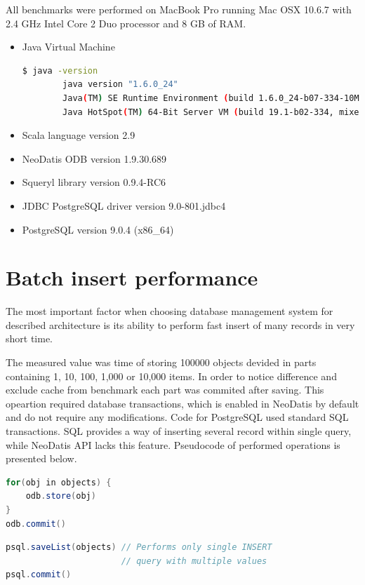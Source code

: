 \documentclass[a4paper,titlepage,12pt]{article}
\begin{document}
All benchmarks were performed on MacBook Pro running Mac OSX 10.6.7 with 2.4 GHz Intel Core 2 Duo processor and 8 GB of RAM.

\begin{itemize}
    \item Java Virtual Machine
        \begin{lstlisting}[language=bash]
        $ java -version
        java version "1.6.0_24"
        Java(TM) SE Runtime Environment (build 1.6.0_24-b07-334-10M3326)
        Java HotSpot(TM) 64-Bit Server VM (build 19.1-b02-334, mixed mode)
        \end{lstlisting}
        
    \item Scala language version 2.9
    \item NeoDatis ODB version 1.9.30.689
    \item Squeryl library version 0.9.4-RC6
    \item JDBC PostgreSQL driver version 9.0-801.jdbc4
    \item PostgreSQL version 9.0.4 (x86\_64)


\end{itemize}

\section{Batch insert performance}\label{sec:batch_insert}


The most important factor when choosing database management system for described architecture is its ability to perform fast insert of many records in very short time.

The measured value was time of storing 100000 objects devided in parts containing 1, 10, 100, 1,000 or 10,000 items. In order to notice difference and exclude cache from benchmark each part was commited after saving. This opeartion required database transactions, which is enabled in NeoDatis by default and do not require any modifications. Code for PostgreSQL used standard SQL transactions. SQL provides a way of inserting several record within single query, while NeoDatis API lacks this feature. Pseudocode of performed operations is presented below.

\begin{lstlisting}[language=Java, caption=NeoDatis code]
for(obj in objects) {
    odb.store(obj)
}
odb.commit()
\end{lstlisting}

\begin{lstlisting}[language=Java, caption=PostgeSQL code]
psql.saveList(objects) // Performs only single INSERT 
                       // query with multiple values
psql.commit()
\end{lstlisting}
\end{document}
